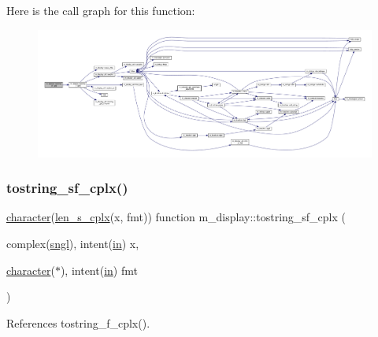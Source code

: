 Here is the call graph for this function\+:
\nopagebreak
\begin{figure}[H]
\begin{center}
\leavevmode
\includegraphics[width=350pt]{namespacem__display_a9f3f8dad4340213fd6587a5657b366e0_cgraph}
\end{center}
\end{figure}
\mbox{\label{namespacem__display_a2a7022ce15edf03ceccb423e9da40c87}} 
\subsubsection{\texorpdfstring{tostring\+\_\+sf\+\_\+cplx()}{tostring\_sf\_cplx()}}
{\footnotesize\ttfamily \hyperlink{option__stopwatch_83_8txt_abd4b21fbbd175834027b5224bfe97e66}{character}(\hyperlink{namespacem__display_a7b573fb0cba7c7c954a820cdfe1c7968}{len\+\_\+s\+\_\+cplx}(x, fmt)) function m\+\_\+display\+::tostring\+\_\+sf\+\_\+cplx (\begin{DoxyParamCaption}\item[{complex(\hyperlink{namespacem__display_a2ac86bc535c3ccc5947dbb3109c666b5}{sngl}), intent(\hyperlink{M__journal_83_8txt_afce72651d1eed785a2132bee863b2f38}{in})}]{x,  }\item[{\hyperlink{option__stopwatch_83_8txt_abd4b21fbbd175834027b5224bfe97e66}{character}($\ast$), intent(\hyperlink{M__journal_83_8txt_afce72651d1eed785a2132bee863b2f38}{in})}]{fmt }\end{DoxyParamCaption})\hspace{0.3cm}{\ttfamily [private]}}



References tostring\+\_\+f\+\_\+cplx().

